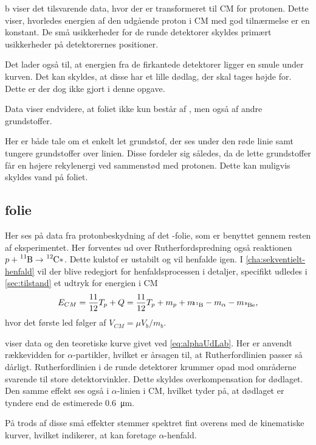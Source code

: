 b viser det tilsvarende data, hvor der er transformeret til CM for protonen. Dette
viser, hvorledes energien af den udgående proton i CM med god tilnærmelse er en konstant. De
små usikkerheder for de runde detektorer skyldes primært usikkerheder på detektorernes
positioner.

Det lader også til, at energien fra de firkantede detektorer ligger en smule under kurven. Det kan
skyldes, at disse har et lille dødlag, der skal tages højde for. Dette er der dog ikke gjort i
denne opgave.

Data viser endvidere, at foliet ikke kun består af \Carb, men også af andre
grundstoffer. 

Her er både tale om et enkelt let grundstof, der ses under den røde linie samt tungere grundstoffer
over linien. Disse fordeler sig således, da de lette grundstoffer får en højere rekylenergi ved
sammenstød med protonen. Dette kan muligvis skyldes vand på foliet. 

\subsection{\Bor folie}
\label{sec:tykt-folie}

Her ses på data fra protonbeskydning af det \Bor-folie, som er benyttet gennem resten af
eksperimentet. Her forventes ud over Rutherfordspredning også reaktionen
$p + \Bor \rightarrow \Carb*$. Dette kulstof er ustabilt og vil henfalde igen. I
\cref{cha:sekventielt-henfald} vil der blive redegjort for henfaldsprocessen i detaljer, specifikt
udledes i \cref{sec:tilstand} et udtryk for energien i CM
\begin{equation}
  E_{CM} = \frac{11}{12} T_{p} + Q = \frac{11}{12} T_{p} + m_{p} + m_{\!\!\Bor} - m_{\alpha} - m_{\Be},
\end{equation}
hvor det første led følger af $V_{CM} = \mu V_{b} / m_{b}$. 

 viser data og den teoretiske kurve givet ved \cref{eq:alphaUdLab}. Her er anvendt
rækkevidden for $\alpha$-partikler, hvilket er årsagen til, at Rutherfordlinien passer så
dårligt. Rutherfordlinien i de runde detektorer krummer opad mod områderne svarende til store
detektorvinkler. Dette skyldes overkompensation for dødlaget.  Den samme effekt ses også i $\alpha$-linien
i CM, hvilket tyder på, at dødlaget er tyndere end de estimerede \SI{0,6}{\um}.

På trods af disse små effekter stemmer spektret fint overens med de kinematiske kurver, hvilket
indikerer, at \Carb* kan foretage $\alpha$-henfald.


